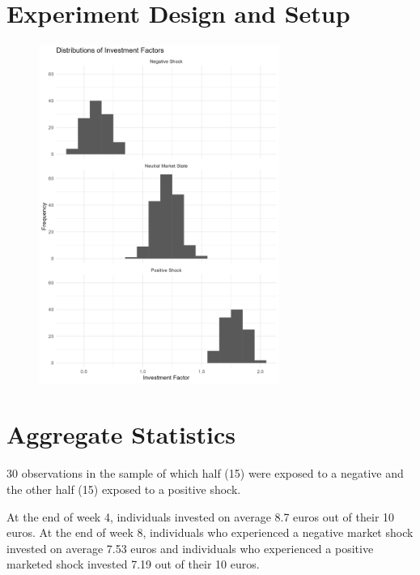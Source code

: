 \documentclass[12pt, a4paper]{article}
\theoremstyle{remark}
\begin{document}
\section{Experiment Design and Setup}

\begin{figure}[H]
	\centering
	\includegraphics[width=0.7\textwidth]{investment-factors-distributions}
\end{figure}


\section{Aggregate Statistics}



30 observations in the sample of which half (15) were exposed to a negative and the other half (15) exposed to a positive shock.

At the end of week 4, individuals invested on average 8.7 euros out of their 10 euros. At the end of week 8, individuals who experienced a negative market shock invested on average 7.53 euros and individuals who experienced a positive marketed shock invested 7.19 out of their 10 euros.
\end{document}
